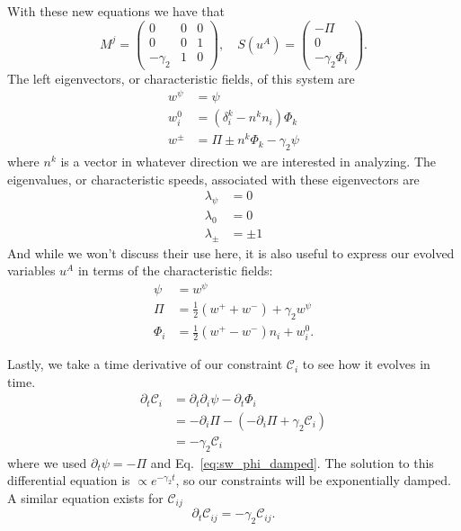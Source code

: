\begin{bibunit}[unsrtnat]
With these new equations we have that
\begin{equation}
   M^j = \left(
      \begin{matrix}
         0 & 0 & 0 \\
         0 & 0 & 1 \\
         -\gamma_2 & 1 & 0
      \end{matrix}
   \right),\quad
   S(u^A) = \left(
      \begin{matrix}
         -\Pi \\
         0 \\
         -\gamma_2\Phi_i
      \end{matrix}
   \right).
\end{equation}
The left eigenvectors, or characteristic fields, of this system are
\begin{align}
   w^\psi &= \psi \\
   w^0_i &= (\delta_i^k - n^kn_i)\Phi_k\\
   w^\pm &= \Pi \pm n^k\Phi_k - \gamma_2\psi \label{eq:sw_char_fields}
\end{align}
where $n^k$ is a vector in whatever direction we are interested in analyzing.
The eigenvalues, or characteristic speeds, associated with these eigenvectors are
\begin{align}
   \lambda_\psi &= 0 \label{eq:sw_char_speed_psi}\\
   \lambda_0 &= 0 \label{eq:sw_char_speed_0}\\
   \lambda_\pm &= \pm 1  \label{eq:sw_char_speed_pm}
\end{align}
And while we won't discuss their use here, it is also useful to express our
evolved variables $u^A$ in terms of the characteristic fields:
\begin{align}
   \psi &= w^\psi \\
   \Pi &= \frac{1}{2}(w^++w^-) + \gamma_2w^\psi\\
   \Phi_i &= \frac{1}{2}(w^+-w^-)n_i + w_i^0 .
\end{align}

Lastly, we take a time derivative of our constraint $\mathcal{C}_i$ to see how
it evolves in time.
\begin{align}
   \partial_t\mathcal{C}_i &= \partial_t\partial_i\psi - \partial_t\Phi_i \\
   &= -\partial_i\Pi - (-\partial_i\Pi + \gamma_2\mathcal{C}_i) \\
   &= - \gamma_2\mathcal{C}_i
\end{align}
where we used $\partial_t\psi=-\Pi$ and Eq.~\ref{eq:sw_phi_damped}. The solution
to this differential equation is $\propto e^{-\gamma_2 t}$, so our constraints
will be exponentially damped. A similar equation exists for $\mathcal{C}_{ij}$
\begin{equation}
   \partial_t\mathcal{C}_{ij} = -\gamma_2\mathcal{C}_{ij} .
\end{equation}


\end{bibunit}
